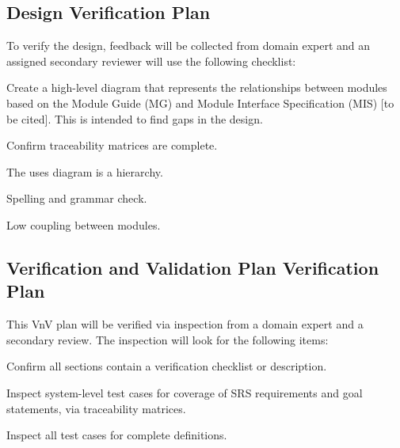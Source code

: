 \documentclass[12pt, titlepage]{article}
\begin{document}


\subsection{Design Verification Plan}

To verify the design, feedback will be collected from domain expert and an assigned secondary
reviewer will use the following checklist:

\begin{todolist}
    \item Create a high-level diagram that represents the relationships between modules based on the
    Module Guide (MG) and Module Interface Specification (MIS) [to be cited]. This is intended to
    find gaps in the design.
    \item Confirm traceability matrices are complete.
    \item The uses diagram is a hierarchy.
    \item Spelling and grammar check.
    \item Low coupling between modules.
\end{todolist}


\subsection{Verification and Validation Plan Verification Plan}

This VnV plan will be verified via inspection from a domain expert and a secondary review. The
inspection will look for the following items:
\begin{todolist}
    \item Confirm all sections contain a verification checklist or description.
    \item Inspect system-level test cases for coverage of SRS requirements and goal statements, via
    traceability matrices.
    \item Inspect all test cases for complete definitions.
\end{todolist}

\end{document}
